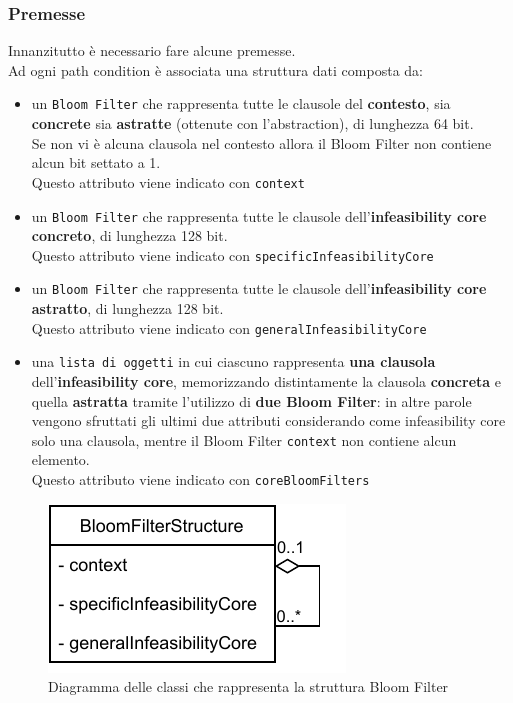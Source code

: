 \documentclass[a4paper, 12pt, oneside]{book}
\theoremstyle{normal}
\begin{document}
\subsubsection{Premesse}
Innanzitutto è necessario fare alcune premesse. \\ Ad ogni path condition è associata una struttura dati composta da:
\begin{itemize}[label=$\bullet$, itemsep=0pt, topsep=2pt]
    \item un \verb|Bloom Filter| che rappresenta tutte le clausole del \textbf{contesto}, sia \textbf{concrete} sia \textbf{astratte} (ottenute con l'abstraction), di lunghezza 64 bit. \\ Se non vi è alcuna clausola nel contesto allora il Bloom Filter non contiene alcun bit settato a 1. \\ Questo attributo viene indicato con \verb|context|
    \item un \verb|Bloom Filter| che rappresenta tutte le clausole dell'\textbf{infeasibility core concreto}, di lunghezza 128 bit. \\ Questo attributo viene indicato con \verb|specificInfeasibilityCore|
    \item un \verb|Bloom Filter| che rappresenta tutte le clausole dell'\textbf{infeasibility core astratto}, di lunghezza 128 bit. \\ Questo attributo viene indicato con \verb|generalInfeasibilityCore|
    \item una \verb|lista di oggetti| in cui ciascuno rappresenta \textbf{una clausola} \linebreak dell'\textbf{infeasibility core}, memorizzando distintamente la clausola \textbf{concreta} e quella \textbf{astratta} tramite l'utilizzo di \textbf{due Bloom Filter}: in altre parole vengono sfruttati gli ultimi due attributi considerando come infeasibility core solo una clausola, mentre il Bloom Filter \verb|context| non contiene alcun elemento. \\ Questo attributo viene indicato con \verb|coreBloomFilters|
\end{itemize}
\begin{figure}[h]
  \centering
  \includegraphics{img/bloom-filter-structure-diagram.pdf}
  \caption{Diagramma delle classi che rappresenta la struttura Bloom Filter}
  \label{diagram:bloom-filter-structure}
\end{figure}
\end{document}
